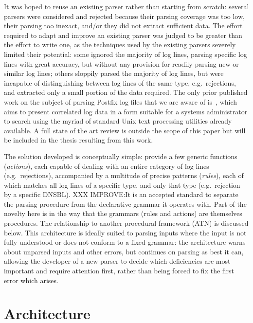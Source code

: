 \documentclass[draft]{svmult}
\begin{document}
It was hoped to reuse an existing parser rather than starting from scratch:
several parsers were considered and rejected because their parsing coverage
was too low, their parsing too inexact, and/or they did not extract
sufficient data.  The effort required to adapt and improve an existing
parser was judged to be greater than the effort to write one, as the
techniques used by the existing parsers severely limited their potential:
some ignored the majority of log lines, parsing specific log lines with
great accuracy, but without any provision for readily parsing new or
similar log lines; others sloppily parsed the majority of log lines, but
were incapable of distinguishing between log lines of the same type, e.g.\
rejections, and extracted only a small portion of the data required.  The
only prior published work on the subject of parsing Postfix log files that
we are aware of is~\cite{log-mail-analyser}, which aims to present
correlated log data in a form suitable for a systems administrator to
search using the myriad of standard Unix text processing utilities already
available.  A full state of the art review is outside the scope of this
paper but will be included in the thesis resulting from this work.

The solution developed is conceptually simple: provide a few generic
functions (\textit{actions\/}), each capable of dealing with an entire
category of log lines (e.g.\ rejections), accompanied by a multitude of
precise patterns (\textit{rules\/}), each of which matches all log lines of
a specific type, and only that type (e.g.\ rejection by a specific DNSBL).
XXX IMPROVE:\@ It is an accepted standard to separate the parsing procedure
from the declarative grammar it operates with.  Part of the novelty here is
in the way that the grammars (rules and actions) are themselves procedures.
The relationship to another procedural framework (ATN) is discussed below.
This architecture is ideally suited to parsing inputs where the input is
not fully understood or does not conform to a fixed grammar: the
architecture warns about unparsed inputs and other errors, but continues on
parsing as best it can, allowing the developer of a new parser to decide
which deficiencies are most important and require attention first, rather
than being forced to fix the first error which arises.

\section{Architecture}
\end{document}
